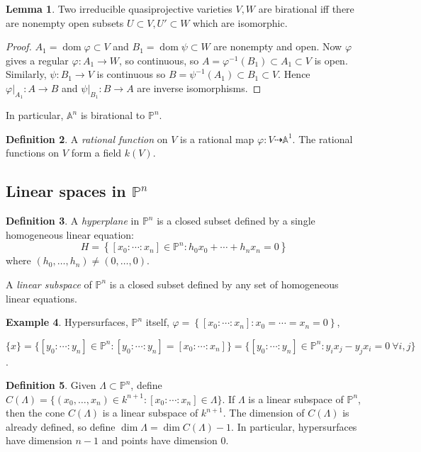 \documentclass{article}
\newcommand{\A}{\mathbb{A}}
\newcommand{\p}{\mathbb{P}}
\newcommand{\dom}{\operatorname{dom}}
\theoremstyle{definition}
\newtheorem{defn}{Definition}[subsection]
\newtheorem{lemma}[defn]{Lemma}
\newtheorem{example}[defn]{Example}
\begin{document}
\begin{lemma}
\label{lemma:biratiffisoopensub}
Two irreducible quasiprojective varieties $V,W$ are birational iff there are nonempty open subsets $U\subset V,U'\subset W$ which are isomorphic.
\end{lemma}
\begin{proof}
$A_1=\dom\varphi\subset V$ and $B_1=\dom\psi\subset W$ are nonempty and open. Now $\varphi$ gives a regular $\varphi:A_1\rightarrow W$, so continuous, so $A=\varphi^{-1}(B_1)\subset A_1\subset V$ is open. Similarly, $\psi:B_1\rightarrow V$ is continuous so $B=\psi^{-1}(A_1)\subset B_1\subset V$. Hence $\left.\varphi\right|_{A_1}:A\rightarrow B$ and $\left.\psi\right|_{B_1}:B\rightarrow A$ are inverse isomorphisms.
\end{proof}
In particular, $\A^n$ is birational to $\p^n$.

\begin{defn}
A \textit{rational function} on $V$ is a rational map $\varphi:V\dashrightarrow\A^1$. The rational functions on $V$ form a field $k(V)$.
\end{defn}

\subsection{Linear spaces in $\p^n$}
\begin{defn}
A \textit{hyperplane} in $\p^n$ is a closed subset defined by a single homogeneous linear equation:
\[
H=\left\{[x_0:\cdots:x_n]\in\p^n:h_0x_0+\cdots+h_nx_n=0\right\}
\]
where $(h_0,\ldots,h_n)\neq (0,\ldots,0)$.

A \textit{linear subspace} of $\p^n$ is a closed subset defined by any set of homogeneous linear equations.
\end{defn}

\begin{example}
Hypersurfaces, $\p^n$ itself, $\varphi=\left\{[x_0:\cdots:x_n]:x_0=\cdots=x_n=0\right\}$,

$\{x\}=\{[y_0:\cdots:y_n]\in\p^n:[y_0:\cdots:y_n]=[x_0:\cdots:x_n]\}=\{[y_0:\cdots:y_n]\in\p^n:y_ix_j-y_jx_i=0 \ \forall i,j\}$.
\end{example}

\begin{defn}
Given $\Lambda\subset\p^n$, define $C(\Lambda)=\{(x_0,\ldots,x_n)\in k^{n+1}:[x_0:\cdots:x_n]\in\Lambda\}$. If $\Lambda$ is a linear subspace of $\p^n$, then the cone $C(\Lambda)$ is a linear subspace of $k^{n+1}$. The dimension of $C(\Lambda)$ is already defined, so define $\dim\Lambda=\dim C(\Lambda)-1$. In particular, hypersurfaces have dimension $n-1$ and points have dimension 0.
\end{defn}
\end{document}
